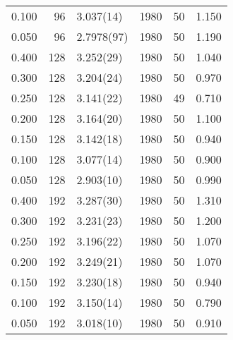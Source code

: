 \begin{tabular}{rrlrrr}
 0.100 &      96 & 3.037(14)  &                1980 &                  50 &    1.150 \\
 0.050 &      96 & 2.7978(97) &                1980 &                  50 &    1.190 \\
 0.400 &     128 & 3.252(29)  &                1980 &                  50 &    1.040 \\
 0.300 &     128 & 3.204(24)  &                1980 &                  50 &    0.970 \\
 0.250 &     128 & 3.141(22)  &                1980 &                  49 &    0.710 \\
 0.200 &     128 & 3.164(20)  &                1980 &                  50 &    1.100 \\
 0.150 &     128 & 3.142(18)  &                1980 &                  50 &    0.940 \\
 0.100 &     128 & 3.077(14)  &                1980 &                  50 &    0.900 \\
 0.050 &     128 & 2.903(10)  &                1980 &                  50 &    0.990 \\
 0.400 &     192 & 3.287(30)  &                1980 &                  50 &    1.310 \\
 0.300 &     192 & 3.231(23)  &                1980 &                  50 &    1.200 \\
 0.250 &     192 & 3.196(22)  &                1980 &                  50 &    1.070 \\
 0.200 &     192 & 3.249(21)  &                1980 &                  50 &    1.070 \\
 0.150 &     192 & 3.230(18)  &                1980 &                  50 &    0.940 \\
 0.100 &     192 & 3.150(14)  &                1980 &                  50 &    0.790 \\
 0.050 &     192 & 3.018(10)  &                1980 &                  50 &    0.910 \\
\hline
\end{tabular}
